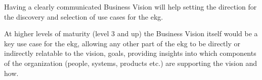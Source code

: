 %
%
Having a clearly communicated Business Vision will help setting the direction for the discovery and selection of
use cases for the \gls{ekg}.

At higher levels of maturity (level 3 and up) the Business Vision itself would be a key use case for the \gls{ekg},
allowing any other part of the \gls{ekg} to be directly or indirectly relatable to the vision, goals, providing
insights into which components of the organization (people, systems, products etc.) are supporting the vision and how.
